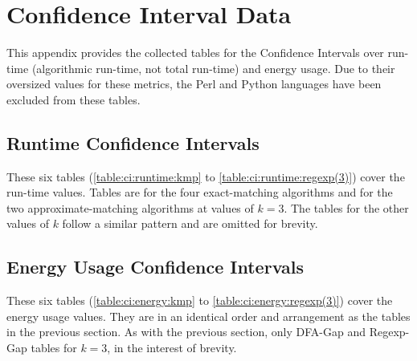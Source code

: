 \section{Confidence Interval Data}

This appendix provides the collected tables for the Confidence Intervals over run-time (algorithmic run-time, not total run-time) and energy usage. Due to their oversized values for these metrics, the Perl and Python languages have been excluded from these tables.

\subsection{Runtime Confidence Intervals}

These six tables (\ref{table:ci:runtime:kmp} to \ref{table:ci:runtime:regexp(3)}) cover the run-time values. Tables are for the four exact-matching algorithms and for the two approximate-matching algorithms at values of $k=3$. The tables for the other values of $k$ follow a similar pattern and are omitted for brevity.













\subsection{Energy Usage Confidence Intervals}

These six tables (\ref{table:ci:energy:kmp} to \ref{table:ci:energy:regexp(3)}) cover the energy usage values. They are in an identical order and arrangement as the tables in the previous section. As with the previous section, only DFA-Gap and Regexp-Gap tables for $k=3$, in the interest of brevity.













